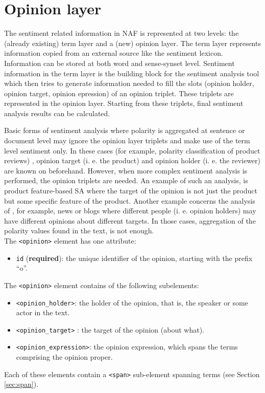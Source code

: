 
\section{Opinion layer}
\label{sec:opinion-layer}

The sentiment related information in NAF is represented at two levels: the
(already existing) term layer and a (new) opinion layer. The term layer
represents information copied from an external source like the sentiment
lexicon. Information can be stored at both word and sense-synset
level. Sentiment information in the term layer is the building block for the
sentiment analysis tool which then tries to generate information needed to
fill the slots (opinion holder, opinion target, opinion epression) of an
opinion triplet. These triplets are represented in the opinion
layer. Starting from these triplets, final sentiment analysis results can be
calculated.

Basic forms of sentiment analysis where polarity is aggregated at sentence
or document level may ignore the opinion layer triplets and make use of the
term level sentiment only. In these cases (for example, polarity
classification of product reviews) , opinion target (i. e. the product) and
opinion holder (i. e. the reviewer) are known on beforehand. However, when
more complex sentiment analysis is performed, the opinion triplets are
needed. An example of such an analysis, is product feature-based SA where
the target of the opinion is not just the product but some specific feature
of the product. Another example concerns the analysis of , for example, news
or blogs where different people (i. e. opinion holders) may have different
opinions about different targets. In those cases, aggregation of the
polarity values found in the text, is not enough.\\


The \texttt{<opinion>} element has one attribute:
\begin{itemize}
\item \texttt{id} (\textbf{required}): the unique identifier of the opinion,
  starting with the prefix ``o''.
\end{itemize}

The \texttt{<opinion>} element contains of the following subelements:
\begin{itemize}
\item \texttt{<opinion\_holder>}: the holder of the opinion, that is, the
  speaker or some actor in the text.
\item \texttt{<opinion\_target>} :  the target of the opinion (about what).
\item \texttt{<opinion\_expression>}: the opinion expression, which spans the
  terms comprising the opinion proper.
\end{itemize}
Each of these elements contain a \texttt{<span>} sub-element spanning terms
(see Section \ref{sec:span}).\\

